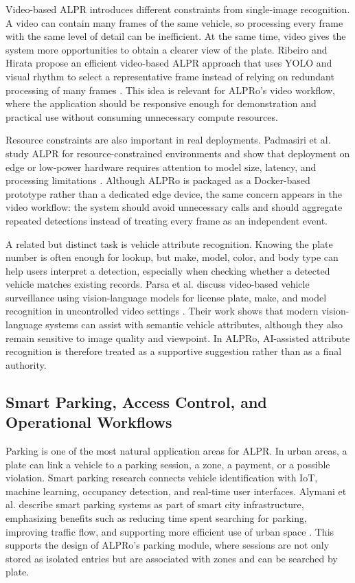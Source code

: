 ﻿\documentclass[12pt,a4paper]{article}
\begin{document}
Video-based ALPR introduces different constraints from single-image recognition. A video can contain many frames of the same vehicle, so processing every frame with the same level of detail can be inefficient. At the same time, video gives the system more opportunities to obtain a clearer view of the plate. Ribeiro and Hirata propose an efficient video-based ALPR approach that uses YOLO and visual rhythm to select a representative frame instead of relying on redundant processing of many frames \cite{Ribeiro2025}. This idea is relevant for ALPRo's video workflow, where the application should be responsive enough for demonstration and practical use without consuming unnecessary compute resources.

Resource constraints are also important in real deployments. Padmasiri et al. study ALPR for resource-constrained environments and show that deployment on edge or low-power hardware requires attention to model size, latency, and processing limitations \cite{Padmasiri2022}. Although ALPRo is packaged as a Docker-based prototype rather than a dedicated edge device, the same concern appears in the video workflow: the system should avoid unnecessary calls and should aggregate repeated detections instead of treating every frame as an independent event.

A related but distinct task is vehicle attribute recognition. Knowing the plate number is often enough for lookup, but make, model, color, and body type can help users interpret a detection, especially when checking whether a detected vehicle matches existing records. Parsa et al. discuss video-based vehicle surveillance using vision-language models for license plate, make, and model recognition in uncontrolled video settings \cite{Parsa2025}. Their work shows that modern vision-language systems can assist with semantic vehicle attributes, although they also remain sensitive to image quality and viewpoint. In ALPRo, AI-assisted attribute recognition is therefore treated as a supportive suggestion rather than as a final authority.

\subsection{Smart Parking, Access Control, and Operational Workflows}

Parking is one of the most natural application areas for ALPR. In urban areas, a plate can link a vehicle to a parking session, a zone, a payment, or a possible violation. Smart parking research connects vehicle identification with IoT, machine learning, occupancy detection, and real-time user interfaces. Alymani et al. describe smart parking systems as part of smart city infrastructure, emphasizing benefits such as reducing time spent searching for parking, improving traffic flow, and supporting more efficient use of urban space \cite{Alymani2025}. This supports the design of ALPRo's parking module, where sessions are not only stored as isolated entries but are associated with zones and can be searched by plate.
\end{document}
